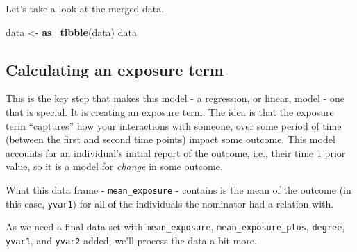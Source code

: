 \documentclass[]{book}
\newenvironment{Shaded}{\begin{snugshade}}{\end{snugshade}}
\newcommand{\KeywordTok}[1]{\textcolor[rgb]{0.13,0.29,0.53}{\textbf{#1}}}
\newcommand{\DataTypeTok}[1]{\textcolor[rgb]{0.13,0.29,0.53}{#1}}
\newcommand{\StringTok}[1]{\textcolor[rgb]{0.31,0.60,0.02}{#1}}
\newcommand{\CommentTok}[1]{\textcolor[rgb]{0.56,0.35,0.01}{\textit{#1}}}
\newcommand{\OperatorTok}[1]{\textcolor[rgb]{0.81,0.36,0.00}{\textbf{#1}}}
\newcommand{\NormalTok}[1]{#1}
\begin{document}
Let's take a look at the merged data.

\begin{Shaded}
\begin{Highlighting}[]
\NormalTok{data <-}\StringTok{ }\KeywordTok{as_tibble}\NormalTok{(data)}
\NormalTok{data}
\end{Highlighting}
\end{Shaded}

\subsection{Calculating an exposure
term}\label{calculating-an-exposure-term}

This is the key step that makes this model - a regression, or linear,
model - one that is special. It is creating an exposure term. The idea
is that the exposure term ``captures'' how your interactions with
someone, over some period of time (between the first and second time
points) impact some outcome. This model accounts for an individual's
initial report of the outcome, i.e., their time 1 prior value, so it is
a model for \emph{change} in some outcome.

\begin{Shaded}
\end{Shaded}

What this data frame - \texttt{mean\_exposure} - contains is the mean of
the outcome (in this case, \texttt{yvar1}) for all of the individuals
the nominator had a relation with.

As we need a final data set with \texttt{mean\_exposure},
\texttt{mean\_exposure\_plus}, \texttt{degree}, \texttt{yvar1}, and
\texttt{yvar2} added, we'll process the data a bit more.
\end{document}
